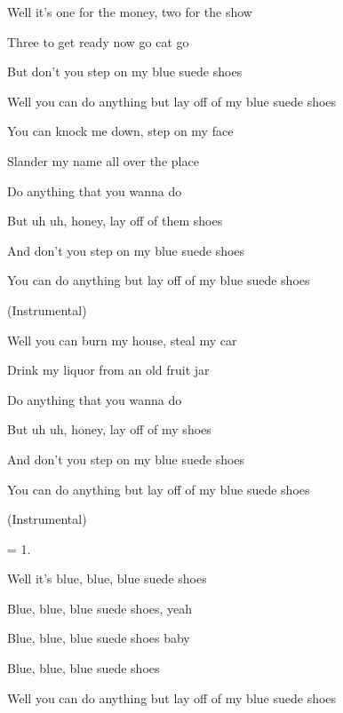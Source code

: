 
\zs
Well it's one for the money,  two for the show

Three to get ready now go cat go

But don't you step on my blue suede shoes

Well you can do anything but lay off of my blue suede shoes
\ks

\zs
You can knock me down, step on my face

Slander my name all over the place

Do anything that you wanna do

But uh uh, honey, lay off of them shoes

And don't you step on my blue suede shoes

You can do anything but lay off of my blue suede shoes
\ks

\zs
(Instrumental)
\ks

\zs
Well you can burn my house, steal my car

Drink my liquor from an old fruit jar

Do anything that you wanna do

But uh uh, honey, lay off of my shoes

And don't you step on my blue suede shoes

You can do anything but lay off of my blue suede shoes
\ks

\zs
(Instrumental)
\ks

\zs
= 1.
\ks

\zs
Well it's blue, blue, blue suede shoes

Blue, blue, blue suede shoes, yeah

Blue, blue, blue suede shoes baby

Blue, blue, blue suede shoes

Well you can do anything but lay off of my blue suede shoes
\ks

\kp
